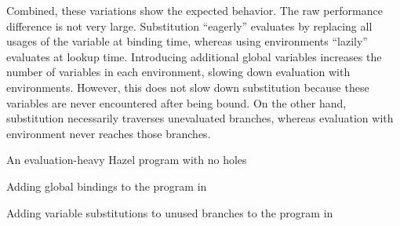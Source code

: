 Combined, these variations show the expected behavior. The raw performance difference is not very large. Substitution ``eagerly'' evaluates by replacing all usages of the variable at binding time, whereas using environments ``lazily'' evaluates at lookup time. Introducing additional global variables increases the number of variables in each environment, slowing down evaluation with environments. However, this does not slow down substitution because these variables are never encountered after being bound. On the other hand, substitution necessarily traverses unevaluated branches, whereas evaluation with environment never reaches those branches.

\begin{listing}
  \caption{An evaluation-heavy Hazel program with no holes}
  \label{fig:perf-fib}
\end{listing}

\begin{listing}
  \caption{Adding global bindings to the program in }
  \label{fig:perf-fib-more-bindings}
\end{listing}

\begin{listing}
  \caption{Adding variable substitutions to unused branches to the program in }
  \label{fig:perf-fib-more-branches}
\end{listing}

